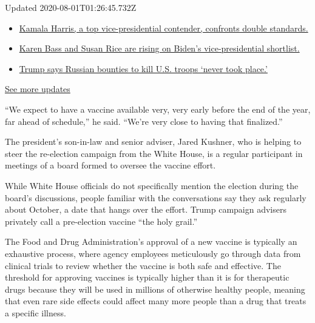 Updated 2020-08-01T01:26:45.732Z

\begin{itemize}
\tightlist
\item
  \href{https://www.nytimes3xbfgragh.onion/2020/07/31/us/elections/biden-vs-trump.html?action=click\&pgtype=Article\&state=default\&region=MAIN_CONTENT_1\&context=storylines_live_updates\#link-29fdff45}{Kamala
  Harris, a top vice-presidential contender, confronts double
  standards.}
\item
  \href{https://www.nytimes3xbfgragh.onion/2020/07/31/us/elections/biden-vs-trump.html?action=click\&pgtype=Article\&state=default\&region=MAIN_CONTENT_1\&context=storylines_live_updates\#link-13ec3d9c}{Karen
  Bass and Susan Rice are rising on Biden's vice-presidential
  shortlist.}
\item
  \href{https://www.nytimes3xbfgragh.onion/2020/07/31/us/elections/biden-vs-trump.html?action=click\&pgtype=Article\&state=default\&region=MAIN_CONTENT_1\&context=storylines_live_updates\#link-49e9a016}{Trump
  says Russian bounties to kill U.S. troops `never took place.'}
\end{itemize}

\href{https://www.nytimes3xbfgragh.onion/2020/07/31/us/elections/biden-vs-trump.html?action=click\&pgtype=Article\&state=default\&region=MAIN_CONTENT_1\&context=storylines_live_updates}{See
more updates}

``We expect to have a vaccine available very, very early before the end
of the year, far ahead of schedule,'' he said. ``We're very close to
having that finalized.''

The president's son-in-law and senior adviser, Jared Kushner, who is
helping to steer the re-election campaign from the White House, is a
regular participant in meetings of a board formed to oversee the vaccine
effort.

While White House officials do not specifically mention the election
during the board's discussions, people familiar with the conversations
say they ask regularly about October, a date that hangs over the effort.
Trump campaign advisers privately call a pre-election vaccine ``the holy
grail.''

The Food and Drug Administration's approval of a new vaccine is
typically an exhaustive process, where agency employees meticulously go
through data from clinical trials to review whether the vaccine is both
safe and effective. The threshold for approving vaccines is typically
higher than it is for therapeutic drugs because they will be used in
millions of otherwise healthy people, meaning that even rare side
effects could affect many more people than a drug that treats a specific
illness.

